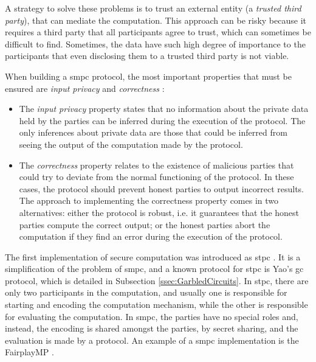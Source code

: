 A strategy to solve these problems is to trust an external entity (a \emph{trusted third party}), that can mediate the computation. This approach can be risky because it requires a third party that all participants agree to trust, which can sometimes be difficult to find. Sometimes, the data have such high degree of importance to the participants that even disclosing them to a trusted third party is not viable.

When building a \ac{smpc} protocol, the most important properties that must be ensured are \textit{input privacy} and \textit{correctness} \cite{goldreich1998secure}:

\begin{itemize}
    

    \item The \textit{input privacy} property states that no information about the private data held by the parties can be inferred during the execution of the protocol. The only inferences about private data are those that could be inferred from seeing the output of the computation made by the protocol.

    \item The \textit{correctness} property relates to the existence of malicious parties that could try to deviate from the normal functioning of the protocol. In these cases, the protocol should prevent honest parties to output incorrect results. The approach to implementing the correctness property comes in two alternatives: either the protocol is robust, i.e. it guarantees that the honest parties compute the correct output; or the honest parties abort the computation if they find an error during the execution of the protocol.
\end{itemize}

The first implementation of secure computation was introduced as \ac{stpc} \cite{yao1982protocols}. It is a simplification of the problem of \ac{smpc}, and a known protocol for \ac{stpc} is Yao's \ac{gc} protocol, which is detailed in Subsection \ref{ssec:GarbledCircuits}. In \ac{stpc}, there are only two participants in the computation, and usually one is responsible for starting and encoding the computation mechanism, while the other is responsible for evaluating the computation. In \ac{smpc}, the parties have no special roles and, instead, the encoding is shared amongst the parties, by secret sharing, and the evaluation is made by a protocol. An example of a \ac{smpc} implementation is the FairplayMP \cite{ben2008fairplaymp}.

